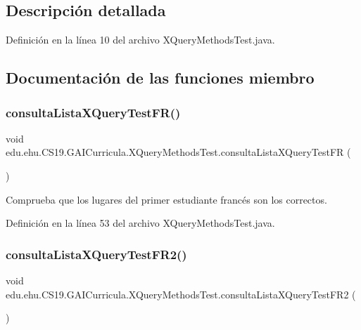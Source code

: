 \subsection{Descripción detallada}


Definición en la línea 10 del archivo X\+Query\+Methods\+Test.\+java.



\subsection{Documentación de las funciones miembro}
\mbox{\label{a00037_a9c391172ac7518b50fad0569a710d3e7}} 
\subsubsection{\texorpdfstring{consultaListaXQueryTestFR()}{consultaListaXQueryTestFR()}}
{\footnotesize\ttfamily void edu.\+ehu.\+C\+S19.\+G\+A\+I\+Curricula.\+X\+Query\+Methods\+Test.\+consulta\+Lista\+X\+Query\+Test\+FR (\begin{DoxyParamCaption}{ }\end{DoxyParamCaption})}



Comprueba que los lugares del primer estudiante francés son los correctos. 



Definición en la línea 53 del archivo X\+Query\+Methods\+Test.\+java.

\mbox{\label{a00037_ab30b1e554a49678887f748e9050ec173}} 
\subsubsection{\texorpdfstring{consultaListaXQueryTestFR2()}{consultaListaXQueryTestFR2()}}
{\footnotesize\ttfamily void edu.\+ehu.\+C\+S19.\+G\+A\+I\+Curricula.\+X\+Query\+Methods\+Test.\+consulta\+Lista\+X\+Query\+Test\+F\+R2 (\begin{DoxyParamCaption}{ }\end{DoxyParamCaption})}



